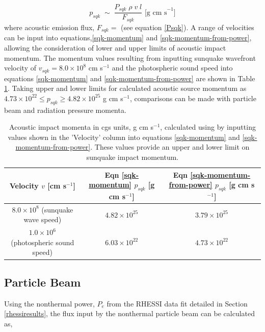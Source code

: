 \begin{equation}\label{sqk-momentum-from-power}
p_{sqk} \; \sim \; \frac{P_{sqk} \; \rho \; v \; l }{F_{sqk}} \text{ [g cm s}^{-1}]
\end{equation}
\noindent
where acoustic emission flux, $F_{sqk} = $ (see equation \ref{Psqk}). A range of velocities can be input into equations,\ref{sqk-momentum} and \ref{sqk-momentum-from-power}, allowing the consideration of lower and upper limits of acoustic impact momentum. The momentum values resulting from inputting sunquake wavefront velocity of $v_{sqk} = 8.0{\times}10^{8}$ cm s$^{-1}$ \citep{2014ApJ...796...85J} and the photospheric sound speed into equations \ref{sqk-momentum} and \ref{sqk-momentum-from-power} are shown in Table \ref{sqk-momenta}. Taking upper and lower limits for calculated acoustic source momentum as $4.73{\times}10^{22} \leq p_{sqk} \geq 4.82{\times}10^{25}$ g cm s$^{-1}$, comparisons can be made with particle beam and radiation pressure momenta.\\
\begin{table}[h]
\centering
\begin{tabular}{|c|c|c|}
Velocity $v$ [cm s$^{-1}$] & Eqn \ref{sqk-momentum} $p_{sqk}$ [g cm s$^{-1}$] & Eqn \ref{sqk-momentum-from-power} $p_{sqk}$ [g cm s$^{-1}$]\\
\hline
$8.0{\times}10^{8}$ (sunquake wave speed) & $4.82{\times}10^{25}$ & $3.79{\times}10^{25}$\\
$1.0{\times}10^{6}$ (photospheric sound speed) & $6.03{\times}10^{22}$ & $4.73{\times}10^{22}$\\
\end{tabular}
\caption{Acoustic impact momenta in cgs units, g cm s$^{-1}$, calculated using by inputting values shown in the 'Velocity' column into equations \ref{sqk-momentum} and \ref{sqk-momentum-from-power}. These values provide an upper and lower limit on sunquake impact momentum.}\label{sqk-momenta}
\end{table}


\subsection{Particle Beam}
Using the nonthermal power, $P_{e}$ from the RHESSI data fit detailed in Section \ref{rhessiresults}, the flux input by the nonthermal particle beam can be calculated as,

